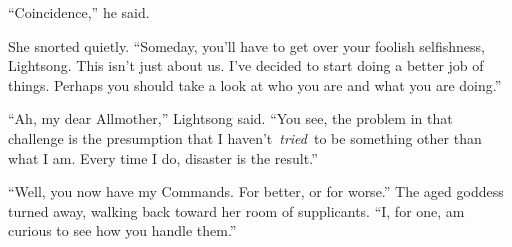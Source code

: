 “Coincidence,” he said.

She snorted quietly. “Someday, you’ll have to get over your foolish selfishness, Lightsong. This isn’t just about us. I’ve decided to start doing a better job of things. Perhaps you should take a look at who you are and what you are doing.”

“Ah, my dear Allmother,” Lightsong said. “You see, the problem in that challenge is the presumption that I haven’t~\textit{tried}~to be something other than what I am. Every time I do, disaster is the result.”

“Well, you now have my Commands. For better, or for worse.” The aged goddess turned away, walking back toward her room of supplicants. “I, for one, am curious to see how you handle them.”


